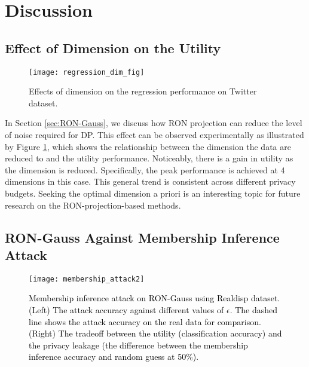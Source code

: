 \documentclass[USenglish,oneside,twocolumn]{article}
\theoremstyle{definition}
\theoremstyle{remark}
\theoremstyle{plain}
\theoremstyle{plain}
\newcommand{\chang}{\textcolor{black}}
\begin{document}
\section{Discussion} \label{sec:discussion}

\subsection{Effect of Dimension on the Utility}

\begin{figure}
\begin{centering}
\texttt{[image: regression\_dim\_fig]} 
\par\end{centering}
\caption{Effects of dimension on the regression performance on Twitter dataset.
\label{fig:Effects-of-dimension}}
\end{figure}

In Section \ref{sec:RON-Gauss}, we discuss how RON projection
can reduce the level of noise required for DP. This effect can be
observed experimentally as illustrated by Figure \ref{fig:Effects-of-dimension},
which shows the relationship between the dimension the data are reduced
to and the utility performance. Noticeably, there is a gain in utility
as the dimension is reduced. Specifically, the peak performance is
achieved at 4 dimensions in this case. This general trend is consistent
across different privacy budgets. Seeking the optimal dimension a
priori is an interesting topic for future research on the RON-projection-based
methods.

\vspace{-1em}
\subsection{RON-Gauss Against Membership Inference Attack}

\begin{figure}
\begin{centering}
\texttt{[image: membership\_attack2]} 
\par\end{centering}
\caption{\chang{Membership inference attack on RON-Gauss using Realdisp dataset. (Left) The attack accuracy against different values of $\epsilon$. The dashed line shows the attack accuracy on the real data for comparison. (Right) The tradeoff between the utility (classification accuracy) and the privacy leakage (the difference between the membership inference accuracy and random guess at 50\%)}.
\label{fig:inference-attack}}
\end{figure}
\end{document}

